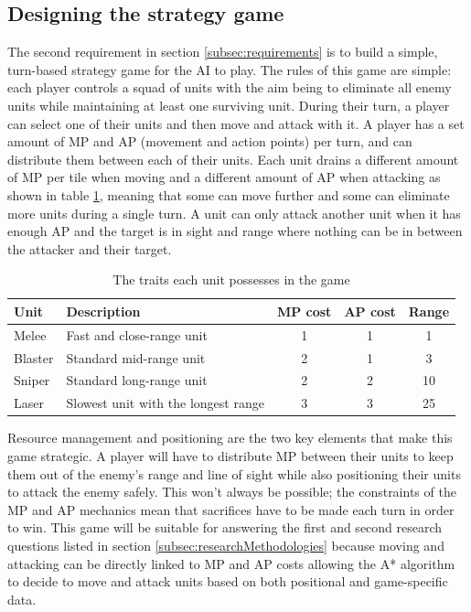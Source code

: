 \documentclass[11pt, a4paper]{report}
\begin{document}
\subsection{Designing the strategy game}
\label{subsec:designingStrategyGame}

The second requirement in section \ref{subsec:requirements} is to build a simple, turn-based strategy game for the AI to play. The rules of this game are simple: each player controls a squad of units with the aim being to eliminate all enemy units while maintaining at least one surviving unit. During their turn, a player can select one of their units and then move and attack with it. A player has a set amount of MP and AP (movement and action points) per turn, and can distribute them between each of their units. Each unit drains a different amount of MP per tile when moving and a different amount of AP when attacking as shown in table \ref{table:unitOverview}, meaning that some can move further and some can eliminate more units during a single turn. A unit can only attack another unit when it has enough AP and the target is in sight and range where nothing can be in between the attacker and their target.

\begin{table}[!h]
  \centering
  \begin{tabular}{ | l | p{6cm} | c | c | c |}
    \hline
    \textbf{Unit} & \textbf{Description} & \textbf{MP cost} & \textbf{AP cost} & \textbf{Range} \\ \hline
    Melee & Fast and close-range unit & 1 & 1 & 1 \\ \hline
    Blaster & Standard mid-range unit & 2 & 1 & 3 \\ \hline
    Sniper & Standard long-range unit & 2 & 2 & 10 \\ \hline
    Laser & Slowest unit with the longest range & 3 & 3 & 25 \\ 
    \hline
  \end{tabular}
  \caption{The traits each unit possesses in the game}
  \label{table:unitOverview}
\end{table}

Resource management and positioning are the two key elements that make this game strategic. A player will have to distribute MP between their units to keep them out of the enemy's range and line of sight while also positioning their units to attack the enemy safely. This won't always be possible; the constraints of the MP and AP mechanics mean that sacrifices have to be made each turn in order to win. This game will be suitable for answering the first and second research questions listed in section \ref{subsec:researchMethodologies} because moving and attacking can be directly linked to MP and AP costs allowing the A* algorithm to decide to move and attack units based on both positional and game-specific data.
\end{document}
